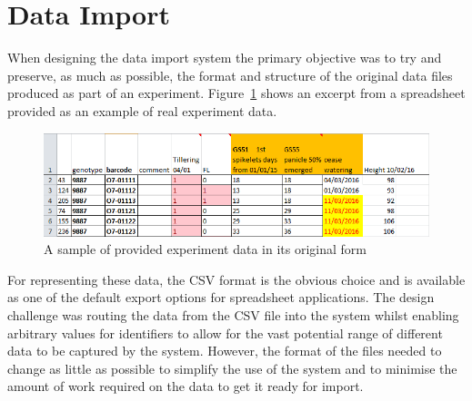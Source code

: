 \section{Data Import}

When designing the data import system the primary objective was to try and preserve, as much as possible, the format and structure of the original data files produced as part of an experiment. Figure~\ref{fig:data1} shows an excerpt from a spreadsheet provided as an example of real experiment data. 

\begin{figure}[H]
    \centering
    \includegraphics[width=\textwidth]{images/design/data1}
    \caption{A sample of provided experiment data in its original form}
    \label{fig:data1}
\end{figure}

For representing these data, the CSV format is the obvious choice and is available as one of the default export options for spreadsheet applications. The design challenge was routing the data from the CSV file into the system whilst enabling arbitrary values for identifiers to allow for the vast potential range of different data to be captured by the system. However, the format of the files needed to change as little as possible to simplify the use of the system and to minimise the amount of work required on the data to get it ready for import.

